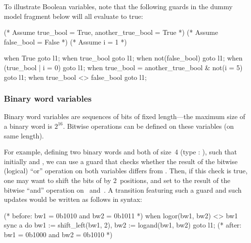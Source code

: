 \begin{example}
	To illustrate Boolean variables, note that the following guards in the dummy model fragment below will all evaluate to true:

	\begin{IMITATORmodel}

		(* Assume true_bool = True, another_true_bool = True *)
		(* Assume false_bool = False *)
		(* Assume i = 1 *)

		when True goto l1;
		when true_bool goto l1;
		when not(false_bool) goto l1;
		when (true_bool | i = 0) goto l1;
		when true_bool = another_true_bool & not(i = 5) goto l1;
		when true_bool <> false_bool goto l1;

	\end{IMITATORmodel}
\end{example}



\subsubsection{Binary word variables}

Binary word variables are sequences of bits of fixed length---the maximum size of a binary word is $2^{16}$.
Bitwise operations can be defined on these variables (on same length).

For example, defining two binary words  and  both of size~4 (type : ), such that initially  and , we can use a guard  that checks whether the result of the bitwise (logical) ``or'' operation on both variables differs from .
Then, if this check is true, one may want to shift the bits of  by 2~positions, and set  to the result of the bitwise ``and'' operation on~ and~.
%
A transition featuring such a guard and such updates would be written as follows in \imitator{} syntax:

\begin{IMITATORmodel}
(* before: bw1 = 0b1010 and bw2 = 0b1011 *)
when logor(bw1, bw2) <> bw1 sync a do {bw1 := shift_left(bw1, 2), bw2 := logand(bw1, bw2)} goto l1;
(* after: bw1 = 0b1000 and bw2 = 0b1010 *)
\end{IMITATORmodel}

